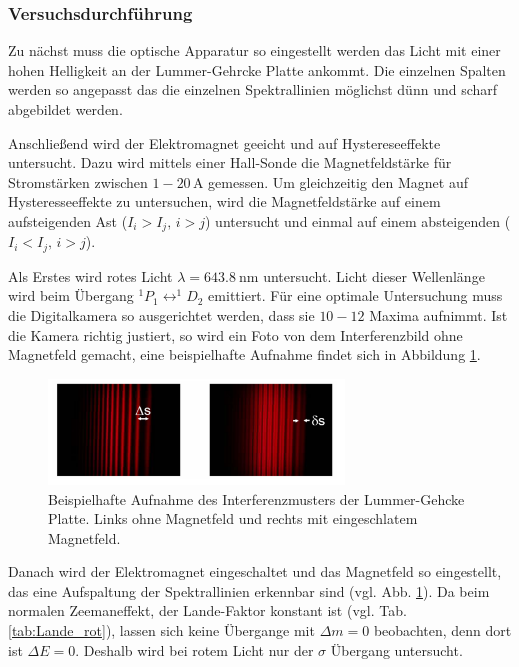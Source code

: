 \subsubsection{Versuchsdurchführung}
Zu nächst muss die optische Apparatur so eingestellt werden das Licht mit einer hohen Helligkeit
an der Lummer-Gehrcke Platte ankommt. Die einzelnen Spalten werden so angepasst das die
einzelnen Spektrallinien möglichst dünn und scharf abgebildet werden.

Anschließend wird der Elektromagnet geeicht und auf Hystereseeffekte untersucht.
Dazu wird mittels einer Hall-Sonde die Magnetfeldstärke für Stromstärken
zwischen $\num{1}-\num{20}\,\si{\ampere}$ gemessen. Um gleichzeitig den Magnet auf Hysteresseeffekte zu untersuchen,
wird die Magnetfeldstärke auf einem aufsteigenden Ast ($I_i>I_j,\, i>j$) untersucht und einmal auf einem absteigenden ($I_i<I_j,\, i>j$).

Als Erstes wird rotes Licht $\lambda = \SI{643.8}{\nano\meter}$ untersucht.
Licht dieser Wellenlänge wird beim Übergang $^1P_1\leftrightarrow ^1\!\!D_2$ emittiert.
Für eine optimale Untersuchung muss die Digitalkamera so ausgerichtet werden, dass sie $10-12$ Maxima aufnimmt.
Ist die Kamera richtig justiert, so wird ein Foto von dem Interferenzbild ohne Magnetfeld gemacht, eine beispielhafte Aufnahme
findet sich in Abbildung \ref{fig: bsp_foto}.
\FloatBarrier
\begin{figure}[h]
  \centering
  \includegraphics[width=0.7\textwidth]{pics/bsp_foto.png}
  \caption{Beispielhafte Aufnahme des Interferenzmusters der Lummer-Gehcke Platte.
  Links ohne Magnetfeld und rechts mit eingeschlatem Magnetfeld\cite{anleitung27}.}
  \label{fig: bsp_foto}
\end{figure}
\FloatBarrier
Danach wird der Elektromagnet eingeschaltet und das Magnetfeld so eingestellt, das eine Aufspaltung der
Spektrallinien erkennbar sind (vgl. Abb. \ref{fig: bsp_foto}). Da beim normalen Zeemaneffekt, der Lande-Faktor konstant ist (vgl. Tab. \ref{tab:Lande_rot}), lassen sich keine
Übergange mit $\Delta m=0$ beobachten, denn dort ist $\Delta E=0$. Deshalb wird bei rotem Licht nur
der $\sigma$ Übergang untersucht.


